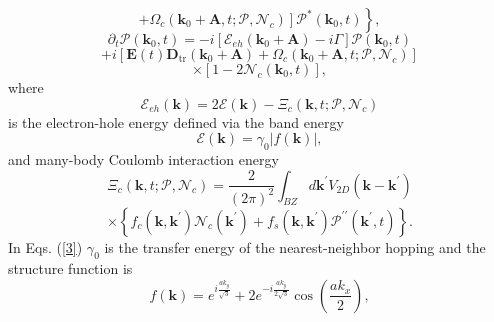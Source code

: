 \documentclass[reprint, superscriptaddress,  aps, pra]{revtex4-2}
\begin{document}
\begin{equation}
\left. \left. +\Omega _{c}\left( \mathbf{k}_{0}+\mathbf{A},t;\mathcal{P},%
\mathcal{N}_{c}\right) \right] \mathcal{P}^{\ast }(\mathbf{k}_{0},t)\right\}
,  \label{1}
\end{equation}%
\begin{equation*}
\partial _{t}\mathcal{P}(\mathbf{k}_{0},t)=-i\left[ \mathcal{E}_{eh}\left( 
\mathbf{k}_{0}+\mathbf{A}\right) -i\Gamma \right] \mathcal{P}(\mathbf{k}%
_{0},t)
\end{equation*}%
\begin{equation*}
+i\left[ \mathbf{E}\left( t\right) \mathbf{D}_{\mathrm{tr}}\left( \mathbf{k}%
_{0}+\mathbf{A}\right) +\Omega _{c}\left( \mathbf{k}_{0}+\mathbf{A},t;%
\mathcal{P},\mathcal{N}_{c}\right) \right]
\end{equation*}%
\begin{equation}
\times \left[ 1-2\mathcal{N}_{c}(\mathbf{k}_{0},t)\right] ,
\label{2}
\end{equation}%
where 
\begin{equation}
\mathcal{E}_{eh}\left( \mathbf{k}\right) =2\mathcal{E}\left( \mathbf{k}%
\right) -\Xi _{c}(\mathbf{k},t;\mathcal{P},\mathcal{N}_{c})  \label{21}
\end{equation}%
is the electron-hole energy defined via the band energy 
\begin{equation}
\mathcal{E}\left( \mathbf{k}\right) =\gamma _{0}\left\vert f\left( \mathbf{k}%
\right) \right\vert ,  \label{3}
\end{equation}%
and many-body Coulomb interaction energy%
\begin{equation*}
\Xi _{c}(\mathbf{k},t;\mathcal{P},\mathcal{N}_{c})=\frac{2}{\left( 2\pi
\right) ^{2}}\int_{BZ}d\mathbf{k}^{\prime }V_{2D}\left( \mathbf{k-k}^{\prime
}\right)
\end{equation*}%
\begin{equation}
\times \left\{ f_{c}\left( \mathbf{k,k}^{\prime }\right) \mathcal{N}%
_{c}\left( \mathbf{k}^{\prime }\right) +f_{s}\left( \mathbf{k,k}^{\prime
}\right) \mathcal{P}^{\prime \prime }\left( \mathbf{k}^{\prime },t\right)
\right\} .  \label{4}
\end{equation}%
In Eqs. (\ref{3}) $\gamma _{0}$ is the transfer energy of the
nearest-neighbor hopping and the structure function is 
\begin{equation}
f\left( \mathbf{k}\right) =e^{i\frac{ak_{y}}{\sqrt{3}}}+2e^{-i\frac{ak_{y}}{2%
\sqrt{3}}}\cos \left( \frac{ak_{x}}{2}\right) ,  \label{5}
\end{equation}%
\end{document}
